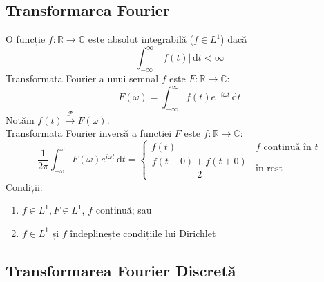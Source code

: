 \documentclass{article}
\begin{document}
\subsection{Transformarea Fourier}

O funcție $f\colon\mathbb{R}\to\mathbb{C}$ este absolut integrabilă ($f \in L^1$) dacă
\[\int_{-\infty}^{\infty}{|f(t)|\,\mathrm{d}t}<\infty\]
Transformata Fourier a unui semnal $f$ este $F\colon\mathbb{R}\to\mathbb{C}$:
\[F(\omega)=\int_{-\infty}^{\infty}{f(t)e^{-i\omega t}\,\mathrm{d}t}\]
Notăm \(f(t)\overset{\mathcal{F}}{\longrightarrow}F(\omega)\). \\
Transformata Fourier inversă a funcției $F$ este $f\colon\mathbb{R}\to\mathbb{C}$:
\[
    \frac{1}{2\pi}\int_{-\omega}^{\omega}{F(\omega)e^{i\omega t}\,\mathrm{d}t}=
    \begin{cases}
        f(t) & \text{$f$ continuă în $t$} \\
        \dfrac{f(t-0)+f(t+0)}{2} & \text{în rest}
    \end{cases}
\]
Condiții:
\begin{enumerate}
\item $f\in L^1,F\in L^1$, $f$ continuă; sau
\item $f\in L^1$ și $f$ îndeplinește condițiile lui Dirichlet
\end{enumerate}

\subsection{Transformarea Fourier Discretă}
\end{document}
